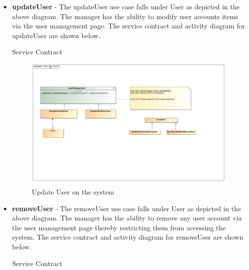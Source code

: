 \documentclass[english]{article}
\begin{document}
\begin{itemize}
\begin{figure}[H]
	  			\end{figure}
	  
	  		\newpage
	  		\item \textbf{updateUser} - The updateUser use case falls under User as depicted in the above diagram. The manager has the ability to modify user accounts items via the user management page. The service contract and activity diagram for updateUser are shown below.
	  		
	  		
	  			\begin{center}
	  				Service Contract
	  			\end{center}
	  			
	  			\begin{figure}[H]
	  				\begin{center}
	  					\includegraphics[scale=0.25]{UpdateUserContract.jpg}
	  				\end{center}
	  				\caption{Update User on the system}
	  				
	  			\end{figure}
	  		
	  		
	  		\newpage	
			\item \textbf{removeUser} - The removeUser use case falls under User as depicted in the above diagram. The manager has the ability to remove any user account via the user management page thereby restricting them from accessing the system. The service contract and activity diagram for removeUser are shown below.
			
			\begin{center}
				Service Contract
			\end{center}
			

\end{itemize}
\end{document}
